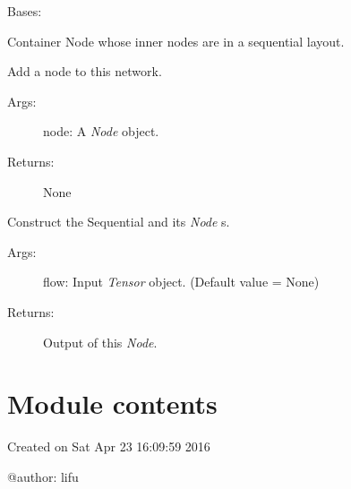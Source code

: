 \documentclass[letterpaper,10pt,english]{sphinxmanual}
\begin{document}
\begin{fulllineitems}
\label{legonet:legonet.topology.Sequential}
Bases: {\hyperref[legonet:legonet.topology.Node]{\emph{}}}

Container Node whose inner nodes are in a sequential layout.

\begin{fulllineitems}
\label{legonet:legonet.topology.Sequential.add}
Add a node to this network.
\begin{description}
\item[{Args:}] \leavevmode
node: A \emph{Node} object.

\item[{Returns:}] \leavevmode
None

\end{description}

\end{fulllineitems}


\begin{fulllineitems}
\label{legonet:legonet.topology.Sequential.call}
Construct the Sequential and its \emph{Node} s.
\begin{description}
\item[{Args:}] \leavevmode
flow: Input \emph{Tensor} object. (Default value = None)

\item[{Returns:}] \leavevmode
Output of this \emph{Node}.

\end{description}

\end{fulllineitems}


\end{fulllineitems}



\section{Module contents}
\label{legonet:module-legonet}\label{legonet:module-contents}
Created on Sat Apr 23 16:09:59 2016

@author: lifu
\end{document}

